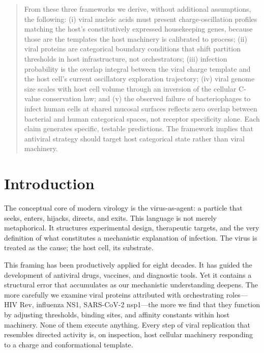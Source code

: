 \begin{quote}
From these three frameworks we derive, without additional assumptions, the following: (i) viral nucleic acids must present charge-oscillation profiles matching the host's constitutively expressed housekeeping genes, because those are the templates the host machinery is calibrated to process; (ii) viral proteins are categorical boundary conditions that shift partition thresholds in host infrastructure, not orchestrators; (iii) infection probability is the overlap integral between the viral charge template and the host cell's current oscillatory exploration trajectory; (iv) viral genome size scales with host cell volume through an inversion of the cellular C-value conservation law; and (v) the observed failure of bacteriophages to infect human cells at shared mucosal surfaces reflects zero overlap between bacterial and human categorical spaces, not receptor specificity alone. Each claim generates specific, testable predictions. The framework implies that antiviral strategy should target host categorical state rather than viral machinery.
\end{quote}



\thispagestyle{empty}



\newpage

\newpage

\section{Introduction}
\label{v:sec:introduction}

The conceptual core of modern virology is the virus-as-agent: a particle that seeks, enters, hijacks, directs, and exits. This language is not merely metaphorical. It structures experimental design, therapeutic targets, and the very definition of what constitutes a mechanistic explanation of infection. The virus is treated as the cause; the host cell, its substrate.

This framing has been productively applied for eight decades. It has guided the development of antiviral drugs, vaccines, and diagnostic tools. Yet it contains a structural error that accumulates as our mechanistic understanding deepens. The more carefully we examine viral proteins attributed with orchestrating roles---HIV Rev, influenza NS1, SARS-CoV-2 nsp1---the more we find that they function by adjusting thresholds, binding sites, and affinity constants within host machinery. None of them execute anything. Every step of viral replication that resembles directed activity is, on inspection, host cellular machinery responding to a charge and conformational template.

